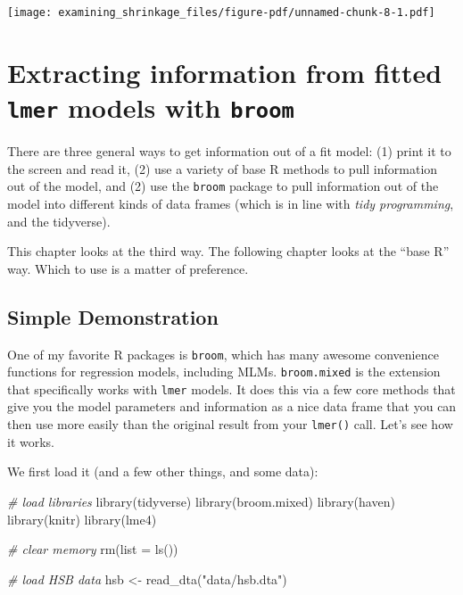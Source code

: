\documentclass[
  letterpaper,
  DIV=11,
  numbers=noendperiod]{scrreprt}
\newenvironment{Shaded}{}{}
\newcommand{\AttributeTok}[1]{\textcolor[rgb]{0.49,0.56,0.16}{#1}}
\newcommand{\CommentTok}[1]{\textcolor[rgb]{0.38,0.63,0.69}{\textit{#1}}}
\newcommand{\FunctionTok}[1]{\textcolor[rgb]{0.02,0.16,0.49}{#1}}
\newcommand{\NormalTok}[1]{#1}
\newcommand{\OtherTok}[1]{\textcolor[rgb]{0.00,0.44,0.13}{#1}}
\newcommand{\StringTok}[1]{\textcolor[rgb]{0.25,0.44,0.63}{#1}}
\begin{document}
\begin{center}
\texttt{[image: examining\_shrinkage\_files/figure-pdf/unnamed-chunk-8-1.pdf]}
\end{center}

\chapter{\texorpdfstring{Extracting information from fitted
\texttt{lmer} models with
\texttt{broom}}{Extracting information from fitted lmer models with broom}}\label{sec-broom}

There are three general ways to get information out of a fit model: (1)
print it to the screen and read it, (2) use a variety of base R methods
to pull information out of the model, and (2) use the \texttt{broom}
package to pull information out of the model into different kinds of
data frames (which is in line with \emph{tidy programming}, and the
tidyverse).

This chapter looks at the third way. The following chapter looks at the
``base R'' way. Which to use is a matter of preference.

\section{Simple Demonstration}\label{simple-demonstration}

One of my favorite R packages is \texttt{broom}, which has many awesome
convenience functions for regression models, including MLMs.
\texttt{broom.mixed} is the extension that specifically works with
\texttt{lmer} models. It does this via a few core methods that give you
the model parameters and information as a nice data frame that you can
then use more easily than the original result from your \texttt{lmer()}
call. Let's see how it works.

We first load it (and a few other things, and some data):

\begin{Shaded}
\begin{Highlighting}[]
\CommentTok{\# load libraries}
\FunctionTok{library}\NormalTok{(tidyverse)}
\FunctionTok{library}\NormalTok{(broom.mixed)}
\FunctionTok{library}\NormalTok{(haven)}
\FunctionTok{library}\NormalTok{(knitr)}
\FunctionTok{library}\NormalTok{(lme4)}

\CommentTok{\# clear memory}
\FunctionTok{rm}\NormalTok{(}\AttributeTok{list =} \FunctionTok{ls}\NormalTok{())}

\CommentTok{\# load HSB data}
\NormalTok{hsb }\OtherTok{\textless{}{-}} \FunctionTok{read\_dta}\NormalTok{(}\StringTok{"data/hsb.dta"}\NormalTok{)}
\end{Highlighting}
\end{Shaded}
\end{document}
